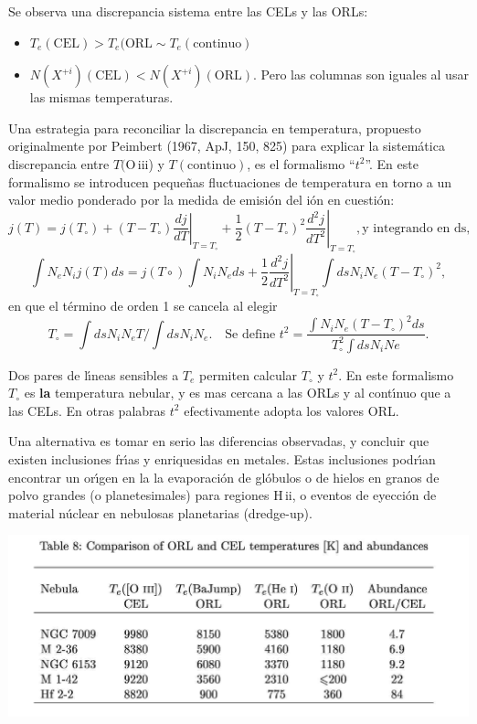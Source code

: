 Se observa una discrepancia sistema entre las CELs y las ORLs: 
\begin{itemize}
\item $T_e(\mathrm{CEL}) > T_e(\mathrm{ORL} \sim T_e(\mathrm{continuo})$
 
\item $N(X^{+i})(\mathrm{CEL}) < N(X^{+i})(\mathrm{ORL})$.  Pero las
columnas son iguales al usar las mismas temperaturas. 
\end{itemize}



Una estrategia para reconciliar la discrepancia en temperatura,
propuesto originalmente por Peimbert (1967, ApJ, 150, 825) para
explicar la sistem\'atica discrepancia entre $T($O\,{\sc iii}) y
$T(\mathrm{continuo})$, es el formalismo ``$t^2$''. En este formalismo
se introducen peque\~nas fluctuaciones de temperatura en torno a un
valor medio ponderado por la medida de emisi\'on del i\'on en
cuesti\'on:
\[
j(T) = j(T_\circ) + (T-T_\circ)
\left. \frac{dj}{dT}\right|_{T=T_\circ} + \left. \frac{1}{2} (T-T_\circ)^2
\frac{d^2j}{dT^2}\right|_{T=T_\circ}, \text{y integrando en ds,}
\]
\[
\int N_e N_i j(T) ds = j(T\circ) \int N_i N_e ds + \left. \frac{1}{2}
\frac{d^2j}{dT^2}\right|_{T=T_\circ} \int ds N_i N_e (T-T_\circ)^2,
\]
en que el t\'ermino de orden 1 se cancela al elegir 
\[
T_\circ = \int ds N_i N_e T / \int ds N_i N_e \text{. ~~Se define } 
t^2 = \frac{\int N_i N_e (T-T_\circ)^2 ds}{T_\circ^2  \int
ds N_i Ne }.\]

Dos pares de l\'{\i}neas sensibles a $T_e$ permiten calcular $T_\circ$
y $t^2$. En este formalismo $T_\circ$ es {\bf la } temperatura
nebular, y es mas cercana a las ORLs y al cont\'{\i}nuo que a las
CELs. En otras palabras $t^2$ efectivamente adopta los valores ORL.



Una alternativa es tomar en serio las diferencias observadas, y
concluir que existen inclusiones fr\'{\i}as y enriquesidas en
metales. Estas inclusiones podr\'{\i}an encontrar un or\'{\i}gen en la
la evaporaci\'on de gl\'obulos o de hielos en granos de polvo grandes
(o planetesimales) para regiones H\,{\sc ii}, o eventos de eyecci\'on
de material n\'uclear en nebulosas planetarias (dredge-up). 

\begin{center}
      \includegraphics[width=\textwidth,height=!]{orl_cel_table.jpg}
\end{center}


